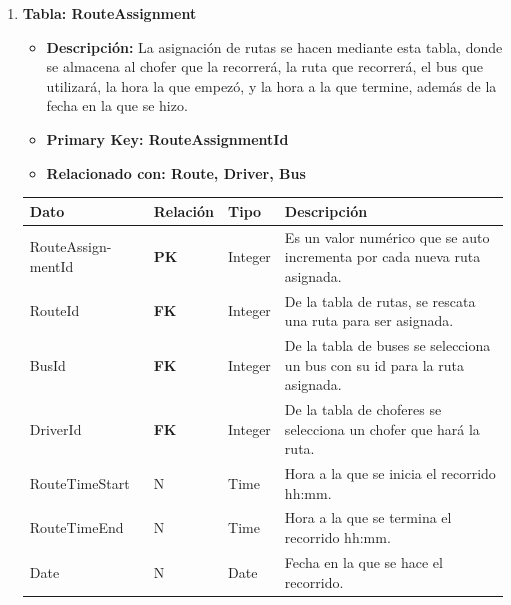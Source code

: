 \documentclass[12pt]{article}
\begin{document}
\begin{enumerate}
    \newpage
    \item \textbf{Tabla: RouteAssignment}
    \begin{itemize}
        \item \textbf{Descripción:} La asignación de rutas se hacen mediante esta tabla, donde se almacena al chofer que la recorrerá, la ruta que recorrerá, el bus que utilizará, la hora la que empezó, y la hora a la que termine, además de la fecha en la que se hizo.
        \item \textbf{Primary Key: RouteAssignmentId}
        \item \textbf{Relacionado con: Route, Driver, Bus}
    \end{itemize}
    \begin{table}[!h]
        \centering
        \begin{tabular}{|p{3cm}|p{2cm}|p{2.5cm}|p{8cm}|}
             \hline
             \textbf{Dato} & \textbf{Relación} & \textbf{Tipo} & \textbf{Descripción} \\
             \hline
             RouteAssign- mentId & \textbf{PK} & Integer & Es un valor numérico que se auto incrementa por cada nueva ruta asignada. \\
             \hline
             RouteId & \textbf{FK} & Integer & De la tabla de rutas, se rescata una ruta para ser asignada.\\
             \hline
             BusId & \textbf{FK} & Integer & De la tabla de buses se selecciona un bus con su id para la ruta asignada.\\
             \hline
             DriverId & \textbf{FK} & Integer & De la tabla de choferes se selecciona un chofer que hará la ruta.\\
             \hline
             RouteTimeStart & N & Time & Hora a la que se inicia el recorrido hh:mm.\\
             \hline
             RouteTimeEnd & N & Time & Hora a la que se termina el recorrido hh:mm.\\
             \hline
             Date & N & Date & Fecha en la que se hace el recorrido.\\
             \hline
        \end{tabular}
    \end{table}


\end{enumerate}
\end{document}
